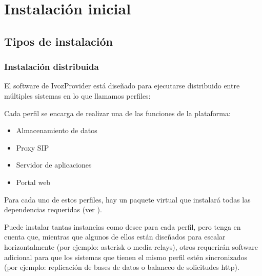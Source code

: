 \documentclass[letterpaper,10pt,spanish]{sphinxmanual}
\begin{document}
\chapter{Instalación inicial}
\label{basic_concepts/installation/index::doc}\label{basic_concepts/installation/index:initial-installation}

\section{Tipos de instalación}
\label{basic_concepts/installation/install_types::doc}\label{basic_concepts/installation/install_types:installation-types}\label{basic_concepts/installation/install_types:distributed-install}

\subsection{Instalación distribuida}
\label{basic_concepts/installation/install_types:distributed-install}\label{basic_concepts/installation/install_types:instalacion-distribuida}\label{basic_concepts/installation/install_types:id1}
El software de IvozProvider está diseñado para ejecutarse distribuido entre múltiples sistemas en lo que llamamos perfiles:

Cada perfil se encarga de realizar una de las funciones de la plataforma:
\begin{itemize}
\item {} 
Almacenamiento de datos

\item {} 
Proxy SIP

\item {} 
Servidor de aplicaciones

\item {} 
Portal web

\end{itemize}

Para cada uno de estos perfiles, hay un paquete virtual que instalará todas las dependencias requeridas (ver {\hyperref[basic_concepts/installation/debian_install:installing\string-profile\string-package]{}}).

Puede instalar tantas instancias como desee para cada perfil, pero tenga en cuenta que, mientras que algunos de ellos están diseñados para escalar horizontalmente (por ejemplo: asterisk o media-relays), otros requerirán software adicional para que los sistemas que tienen el mismo perfil estén sincronizados (por ejemplo: replicación de bases de datos o balanceo de solicitudes http).
\label{basic_concepts/installation/install_types:standalone-install}
\end{document}
